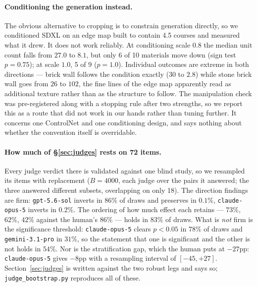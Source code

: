 \documentclass{article}
\begin{document}
\paragraph{Conditioning the generation instead.} The obvious alternative to
cropping is to constrain generation directly, so we conditioned SDXL on an
edge map built to contain 4.5 courses and measured what it drew. It does not
work reliably. At conditioning scale $0.8$ the median unit count falls from
$27.0$ to $8.1$, but only 6 of 10 materials move down (sign test $p{=}0.75$);
at scale $1.0$, 5 of 9 (${p{=}1.0}$). Individual outcomes are extreme in both
directions --- brick wall follows the condition exactly ($30$ to $2.8$) while
stone brick wall goes from $26$ to $102$, the fine lines of the edge map
apparently read as additional texture rather than as the structure to follow.
The manipulation check was pre-registered along with a stopping rule after two
strengths, so we report this as a route that did not work in our hands rather
than tuning further. It concerns one ControlNet and one conditioning design,
and says nothing about whether the convention itself is overridable.

\paragraph{How much of \S\ref{sec:judges} rests on 72 items.} Every judge
verdict there is validated against one blind study, so we resampled its items
with replacement ($B{=}4000$, each judge over the pairs it answered; the three
answered different subsets, overlapping on only 18). The direction findings
are firm: \texttt{gpt-5.6-sol} inverts in $86\%$ of draws and preserves in
$0.1\%$, \texttt{claude-opus-5} inverts in $0.2\%$. The ordering of how much
effect each retains --- $73\%$, $62\%$, $42\%$ against the human's $86\%$ ---
holds in $83\%$ of draws. What is \emph{not} firm is the significance
threshold: \texttt{claude-opus-5} clears $p<0.05$ in $78\%$ of draws and
\texttt{gemini-3.1-pro} in $31\%$, so the statement that one is significant
and the other is not holds in $54\%$. Nor is the stratification gap, which
the human puts at $-27$pp: \texttt{claude-opus-5} gives $-8$pp with a
resampling interval of $[-45, +27]$. Section~\ref{sec:judges} is written
against the two robust legs and says so; \texttt{judge\_bootstrap.py}
reproduces all of these.
\end{document}
